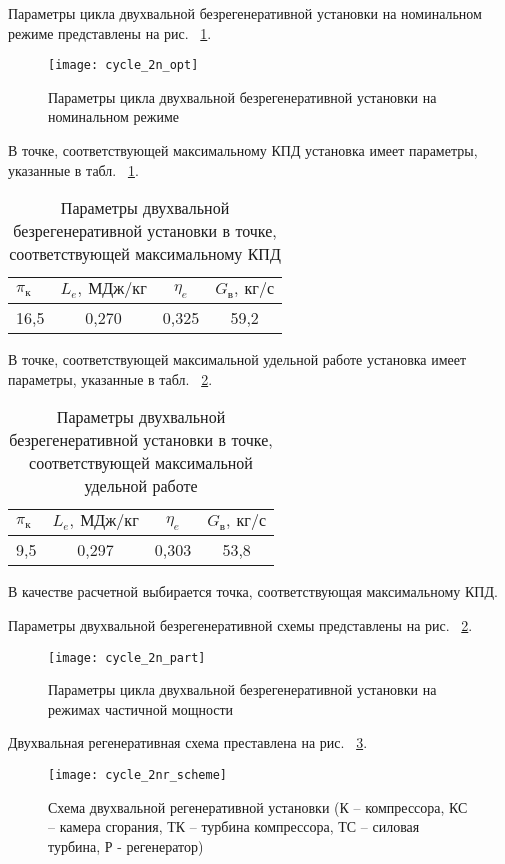 Параметры цикла двухвальной безрегенеративной установки на номинальном режиме представлены на рис. ~\ref{img:cycle_2n_opt}.

\begin{figure}[H]
    \centering
    \texttt{[image: cycle\_2n\_opt]}
    \caption{Параметры цикла двухвальной безрегенеративной установки на номинальном режиме}
    \label{img:cycle_2n_opt}
\end{figure}

В точке, соответствующей максимальному КПД установка имеет параметры, указанные в табл. ~\ref{tab:cycle_2n_max_eta}.

\begin{longtable}{|p{7cm}|c|c|c|}
	\caption{Параметры двухвальной безрегенеративной установки в точке, соответствующей максимальному КПД} 
	\label{tab:cycle_2n_max_eta}
	\hline
	\textbf{$\pi_к$} & \textbf{$L_e, \ МДж/кг$} & \textbf{$\eta_e$} & \textbf{$G_в, \ кг/с$} \\ \hline
	16,5 & 0,270 & 0,325 & 59,2 \\ \hline
\end{longtable}


В точке, соответствующей максимальной удельной работе установка имеет параметры, указанные в табл. ~\ref{tab:cycle_2n_max_labour}.
\begin{longtable}{|p{7cm}|c|c|c|}
	\caption{Параметры двухвальной безрегенеративной установки в точке, соответствующей максимальной удельной работе} 
	\label{tab:cycle_2n_max_labour}
	\hline
	\textbf{$\pi_к$} & \textbf{$L_e, \ МДж/кг$} & \textbf{$\eta_e$} & \textbf{$G_в, \ кг/с$} \\ \hline
	9,5 & 0,297 & 0,303 & 53,8 \\ \hline
\end{longtable}

В качестве расчетной выбирается точка, соответствующая максимальному КПД.

Параметры двухвальной безрегенеративной схемы представлены на рис. ~\ref{img:cycle_2n_part}.

\begin{figure}[H]
    \centering
    \texttt{[image: cycle\_2n\_part]}
    \caption{Параметры цикла двухвальной безрегенеративной установки на режимах частичной мощности}
    \label{img:cycle_2n_part}
\end{figure}

Двухвальная регенеративная схема преставлена на рис. ~\ref{img:cycle_2nr_scheme}.

\begin{figure}[H]
    \centering
    \texttt{[image: cycle\_2nr\_scheme]}
    \caption{Схема двухвальной регенеративной установки (К – компрессора, КС – камера сгорания, ТК – турбина компрессора, ТС – силовая турбина, Р - регенератор)}
    \label{img:cycle_2nr_scheme}
\end{figure}

